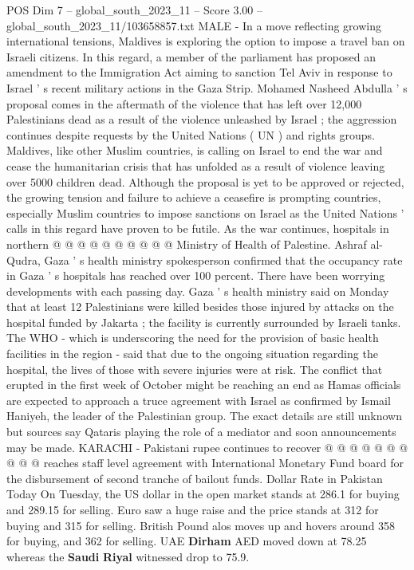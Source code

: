 \begin{textsample}{POS Dim 7 – global\_south\_2023\_11 – Score 3.00 – global\_south\_2023\_11/103658857.txt}  \label{ex:f7_pos_122}
MALE - In a move reflecting growing international tensions, Maldives is exploring the option to impose a travel ban on Israeli citizens.
In this regard, a member of the parliament has proposed an amendment to the Immigration Act aiming to sanction Tel Aviv in response to Israel ' s recent military actions in the Gaza Strip.
Mohamed Nasheed Abdulla ' s proposal comes in the aftermath of the violence that has left over 12,000 Palestinians dead as a result of the violence unleashed by Israel ; the aggression continues despite requests by the United Nations ( UN ) and rights groups.
Maldives, like other Muslim countries, is calling on Israel to end the war and cease the humanitarian crisis that has unfolded as a result of violence leaving over 5000 children dead.
Although the proposal is yet to be approved or rejected, the growing tension and failure to achieve a ceasefire is prompting countries, especially Muslim countries to impose sanctions on Israel as the United Nations ' calls in this regard have proven to be futile.
As the war continues, hospitals in northern @ @ @ @ @ @ @ @ @ @ Ministry of Health of Palestine.
Ashraf al-Qudra, Gaza ' s health ministry spokesperson confirmed that the occupancy rate in Gaza ' s hospitals has reached over 100 percent.
There have been worrying developments with each passing day.
Gaza ' s health ministry said on Monday that at least 12 Palestinians were killed besides those injured by attacks on the hospital funded by Jakarta ; the facility is currently surrounded by Israeli tanks.
The WHO - which is underscoring the need for the provision of basic health facilities in the region - said that due to the ongoing situation regarding the hospital, the lives of those with severe injuries were at risk.
The conflict that erupted in the first week of October might be reaching an end as Hamas officials are expected to approach a truce agreement with Israel as confirmed by Ismail Haniyeh, the leader of the Palestinian group.
The exact details are still unknown but sources say Qataris playing the role of a mediator and soon announcements may be made.
KARACHI - Pakistani rupee continues to recover @ @ @ @ @ @ @ @ @ @ reaches staff level agreement with International Monetary Fund board for the disbursement of second tranche of bailout funds.
Dollar Rate in Pakistan Today On Tuesday, the US dollar in the open market stands at 286.1 for buying and 289.15 for selling.
Euro saw a huge raise and the price stands at 312 for buying and 315 for selling.
British Pound alos moves up and hovers around 358 for buying, and 362 for selling.
UAE \textbf{Dirham} AED moved down at 78.25 whereas the \textbf{Saudi} \textbf{Riyal} witnessed drop to 75.9.

\end{textsample}
